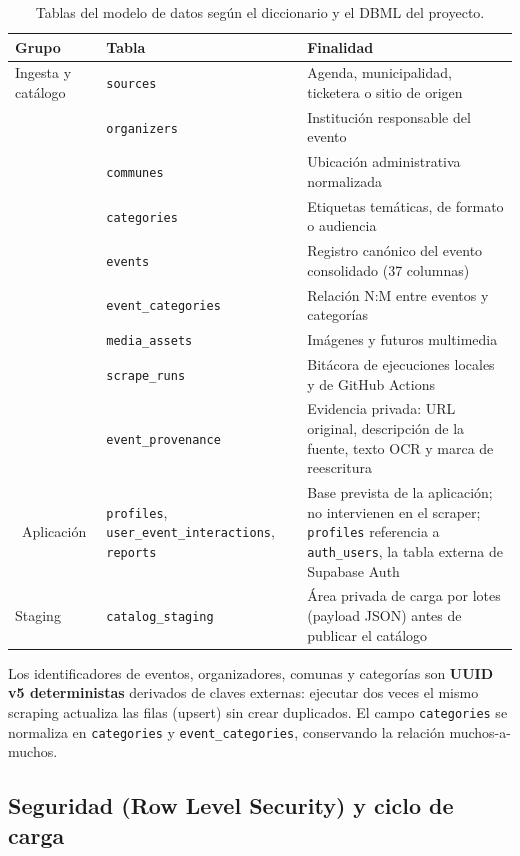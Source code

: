 \begin{table}[ht]
\centering\small
\renewcommand{\arraystretch}{1.25}
\begin{tabular}{l p{4.1cm} p{6.6cm}}
\toprule
\textbf{Grupo} & \textbf{Tabla} & \textbf{Finalidad} \\
\midrule
Ingesta y catálogo & \texttt{sources} & Agenda, municipalidad, ticketera o sitio de origen \\
 & \texttt{organizers} & Institución responsable del evento \\
 & \texttt{communes} & Ubicación administrativa normalizada \\
 & \texttt{categories} & Etiquetas temáticas, de formato o audiencia \\
 & \texttt{events} & Registro canónico del evento consolidado (37 columnas) \\
 & \texttt{event\_categories} & Relación N:M entre eventos y categorías \\
 & \texttt{media\_assets} & Imágenes y futuros multimedia \\
 & \texttt{scrape\_runs} & Bitácora de ejecuciones locales y de GitHub Actions \\
 & \texttt{event\_provenance} & Evidencia privada: URL original, descripción de la fuente, texto OCR y marca de reescritura \\\
Aplicación & \texttt{profiles}, \texttt{user\_event\_interactions}, \texttt{reports} & Base prevista de la aplicación; no intervienen en el scraper; \texttt{profiles} referencia a \texttt{auth\_users}, la tabla externa de Supabase Auth \\
Staging & \texttt{catalog\_staging} & Área privada de carga por lotes (payload JSON) antes de publicar el catálogo \\
\bottomrule
\end{tabular}
\caption{Tablas del modelo de datos según el diccionario y el DBML del proyecto.}
\label{tab:tablas}
\end{table}

Los identificadores de eventos, organizadores, comunas y categorías son \textbf{UUID v5
deterministas} derivados de claves externas: ejecutar dos veces el mismo scraping actualiza
las filas (upsert) sin crear duplicados. El campo \texttt{categories} se normaliza en
\texttt{categories} y \texttt{event\_categories}, conservando la relación muchos-a-muchos.

\subsection{Seguridad (Row Level Security) y ciclo de carga}

